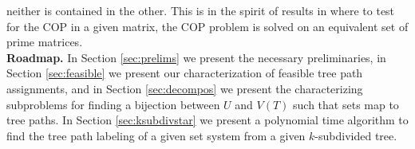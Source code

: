 \documentclass[a4paper,UKenglish,numberwithinsect]{lipics}
\def\cH{{\cal H}}
\def\F{{\mathcal F}}
\begin{document}
neither is contained in the other.  This is in the spirit of results
in \cite{wlh02,nsnrs09} where to test for the COP in a given matrix,
the COP problem is solved on an equivalent set of prime matrices.  \\
{\bf Roadmap.} In Section \ref{sec:prelims} we present the necessary
preliminaries, in Section \ref{sec:feasible} we present our
characterization of feasible tree path assignments, and in Section
\ref{sec:decompos} we present the characterizing subproblems for
finding a bijection between $U$ and $V(T)$ such that sets map to tree
paths. In Section \ref{sec:ksubdivstar} we present a polynomial time
algorithm to find the tree path labeling of a given set system from a
given $k$-subdivided tree.




\end{document}
